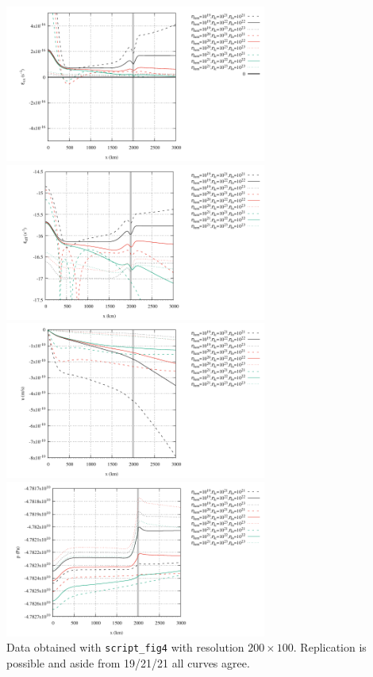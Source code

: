 \begin{center}
\includegraphics[width=8.6cm]{python_codes/fieldstone_143/results/fig4/fig4a}
\includegraphics[width=8.6cm]{python_codes/fieldstone_143/results/fig4/fig4b}\\
\includegraphics[width=8.6cm]{python_codes/fieldstone_143/results/fig4/fig4_u}
\includegraphics[width=8.6cm]{python_codes/fieldstone_143/results/fig4/fig4_p}\\
{\captionfont Data obtained with {\tt script\_fig4} with resolution $200\times 100$.
Replication is possible and aside from 19/21/21 all curves agree.}
\end{center}

